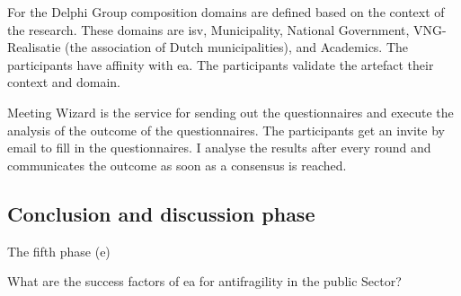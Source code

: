 For the Delphi Group composition domains are defined based on the context of the research. These domains are \acrfull{isv}, Municipality, National Government, VNG-Realisatie (the association of Dutch municipalities), and Academics. The participants have affinity with \acrshort{ea}. The participants validate the artefact their context and domain.

Meeting Wizard is the service for sending out the questionnaires and execute the analysis of the outcome of the questionnaires. The participants get an invite by email to fill in the questionnaires. I analyse the results after every round and communicates the outcome as soon as a consensus is reached.

\subsection{Conclusion and discussion phase}
\label{sub:conclusionanddiscussinophase}
The fifth phase (e)

What are the success factors of \acrlong{ea} for \gls{antifragility} in the public Sector?

